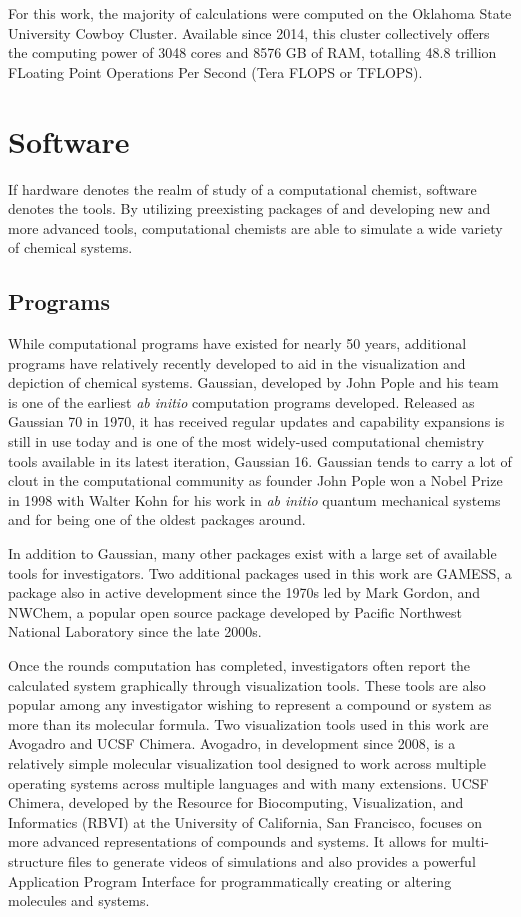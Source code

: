For this work, the majority of calculations were computed on the Oklahoma State University Cowboy Cluster. 
Available since 2014, this cluster collectively offers the computing power of 3048 cores and 8576 GB of RAM, totalling 48.8 trillion FLoating Point Operations Per Second (Tera FLOPS or TFLOPS). 

\section{Software}

If hardware denotes the realm of study of a computational chemist, software denotes the tools. 
By utilizing preexisting packages of and developing new and more advanced tools, computational chemists are able to simulate a wide variety of chemical systems.

\subsection{Programs}

While computational programs have existed for nearly 50 years, additional programs have relatively recently developed to aid in the visualization and depiction of chemical systems.
Gaussian, developed by John Pople and his team is one of the earliest \textit{ab initio} computation programs developed.
Released as Gaussian 70 in 1970, it has received regular updates and capability expansions is still in use today and is one of the most widely-used computational chemistry tools available in its latest iteration, Gaussian 16.
Gaussian tends to carry a lot of clout in the computational community as founder John Pople won a Nobel Prize in 1998 with Walter Kohn for his work in \textit{ab initio} quantum mechanical systems and for being one of the oldest packages around.

In addition to Gaussian, many other packages exist with a large set of available tools for investigators.
Two additional packages used in this work are GAMESS,\cite{GAMESS} a package also in active development since the 1970s led by Mark Gordon, and NWChem,\cite{NWChem} a popular open source package developed by Pacific Northwest National Laboratory since the late 2000s.

Once the rounds computation has completed, investigators often report the calculated system graphically through visualization tools.
These tools are also popular among any investigator wishing to represent a compound or system as more than its molecular formula.
Two visualization tools used in this work are Avogadro and UCSF Chimera.
Avogadro, in development since 2008, is a relatively simple molecular visualization tool designed to work across multiple operating systems across multiple languages and with many extensions.\cite{Avogadro}
UCSF Chimera, developed by the Resource for Biocomputing, Visualization, and Informatics (RBVI) at the University of California, San Francisco, focuses on more advanced representations of compounds and systems. It allows for multi-structure files to generate videos of simulations and also provides a powerful Application Program Interface for programmatically creating or altering molecules and systems.

